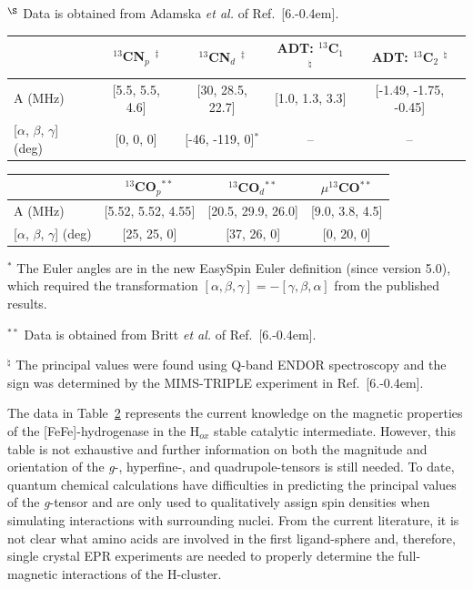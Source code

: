 \begin{table}[hb]
\begin{flushleft}
{$^{\S}$ Data is obtained from Adamska \textit{et al.} of Ref.~[6.\kern-0.4em]. }\end{flushleft}

\begin{tabular}{l|c|c|c|c}
 & $^{13}$CN$_p$ $^\ddagger$ & $^{13}$CN$_d$ $^\ddagger$ & ADT: $^{13}$C$_1$ $^\natural$ & ADT: $^{13}$C$_2$ $^\natural$ \\ \hline \hline
A (MHz) & {[}5.5, 5.5, 4.6{]} & {[}30, 28.5, 22.7{]} & {[}1.0, 1.3, 3.3{]} & {[}-1.49, -1.75, -0.45{]} \\
{[}$\alpha$, $\beta$, $\gamma${]} (deg) & {[}0, 0, 0{]} & {[}-46, -119, 0{]}$^\ast$ & -- & -- \\
\end{tabular}
\newline
\vspace*{0.5em}
\newline
\begin{tabular}{l|c|c|c}
 & $^{13}$CO$_p$$^{\ast\ast}$ & $^{13}$CO$_d$$^{\ast\ast}$ & $\mu^{13}$CO$^{\ast\ast}$ \\ \hline \hline
A (MHz) & {[}5.52, 5.52, 4.55{]} &  {[}20.5, 29.9, 26.0{]} & {[}9.0, 3.8, 4.5{]}\\
{[}$\alpha$, $\beta$, $\gamma${]} (deg) &  {[}25, 25, 0{]} & {[}37, 26, 0{]} & {[}0, 20, 0{]} \\
\end{tabular}\label{table:eprthing}

\begin{flushleft}\footnotesize{
$^\ast$ The Euler angles are in the new EasySpin Euler definition (since version 5.0), which required the transformation $[\alpha,\beta,\gamma]= -[\gamma,\beta,\alpha]$ from the published results.

$^{\ast\ast}$ Data is obtained from Britt \textit{et al.} of Ref.~[6.\kern-0.4em].

$^\natural$ The principal values were found using Q-band ENDOR spectroscopy and the sign was determined by the MIMS-TRIPLE experiment in Ref.~[6.\kern-0.4em].
} \end{flushleft}
\end{table}

The data in Table~\ref{table:eprthing} represents the current knowledge on the magnetic properties of the [FeFe]-hydrogenase in the H$_{ox}$ stable catalytic intermediate. However, this table is not exhaustive and further information on both the magnitude and orientation of the \textit{g}-, hyperfine-, and quadrupole-tensors is still needed. To date, quantum chemical calculations have difficulties in predicting the principal values of the \textit{g}-tensor\cite{GrecoDFT, FiedlerDFT} and are only used to qualitatively assign spin densities when simulating interactions with surrounding nuclei. From the current literature, it is not clear what amino acids are involved in the first ligand-sphere and, therefore, single crystal EPR experiments are needed to properly determine the full-magnetic interactions of the H-cluster. 

